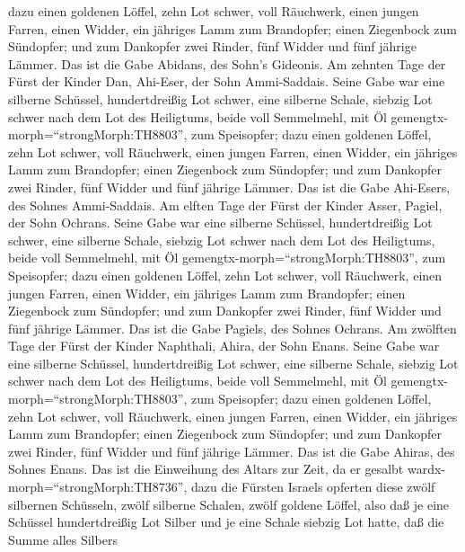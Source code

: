 dazu einen goldenen Löffel, zehn Lot schwer, voll Räuchwerk,
 einen jungen Farren, einen Widder, ein jähriges Lamm zum
Brandopfer;  einen Ziegenbock zum Sündopfer; 
und zum Dankopfer zwei Rinder, fünf Widder und fünf jährige Lämmer. Das
ist die Gabe Abidans, des Sohn's Gideonis.  Am zehnten Tage
der Fürst der Kinder Dan, Ahi-Eser, der Sohn Ammi-Saddais. 
Seine Gabe war eine silberne Schüssel, hundertdreißig Lot schwer, eine
silberne Schale, siebzig Lot schwer nach dem Lot des Heiligtums, beide
voll Semmelmehl, mit Öl gemengtx-morph=``strongMorph:TH8803'', zum
Speisopfer;  dazu einen goldenen Löffel, zehn Lot schwer,
voll Räuchwerk,  einen jungen Farren, einen Widder, ein
jähriges Lamm zum Brandopfer;  einen Ziegenbock zum
Sündopfer;  und zum Dankopfer zwei Rinder, fünf Widder und
fünf jährige Lämmer. Das ist die Gabe Ahi-Esers, des Sohnes
Ammi-Saddais.  Am elften Tage der Fürst der Kinder Asser,
Pagiel, der Sohn Ochrans.  Seine Gabe war eine silberne
Schüssel, hundertdreißig Lot schwer, eine silberne Schale, siebzig Lot
schwer nach dem Lot des Heiligtums, beide voll Semmelmehl, mit Öl
gemengtx-morph=``strongMorph:TH8803'', zum Speisopfer; 
dazu einen goldenen Löffel, zehn Lot schwer, voll Räuchwerk,
 einen jungen Farren, einen Widder, ein jähriges Lamm zum
Brandopfer;  einen Ziegenbock zum Sündopfer; 
und zum Dankopfer zwei Rinder, fünf Widder und fünf jährige Lämmer. Das
ist die Gabe Pagiels, des Sohnes Ochrans.  Am zwölften Tage
der Fürst der Kinder Naphthali, Ahira, der Sohn Enans. 
Seine Gabe war eine silberne Schüssel, hundertdreißig Lot schwer, eine
silberne Schale, siebzig Lot schwer nach dem Lot des Heiligtums, beide
voll Semmelmehl, mit Öl gemengtx-morph=``strongMorph:TH8803'', zum
Speisopfer;  dazu einen goldenen Löffel, zehn Lot schwer,
voll Räuchwerk,  einen jungen Farren, einen Widder, ein
jähriges Lamm zum Brandopfer;  einen Ziegenbock zum
Sündopfer;  und zum Dankopfer zwei Rinder, fünf Widder und
fünf jährige Lämmer. Das ist die Gabe Ahiras, des Sohnes Enans.
 Das ist die Einweihung des Altars zur Zeit, da er gesalbt
wardx-morph=``strongMorph:TH8736'', dazu die Fürsten Israels opferten
diese zwölf silbernen Schüsseln, zwölf silberne Schalen, zwölf goldene
Löffel,  also daß je eine Schüssel hundertdreißig Lot
Silber und je eine Schale siebzig Lot hatte, daß die Summe alles Silbers
